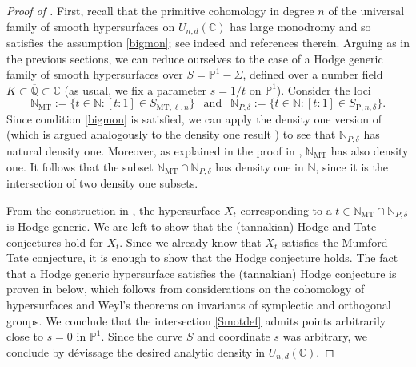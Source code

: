 \documentclass[10pt]{article}
\numberwithin{equation}{section}
\theoremstyle{plain}
\theoremstyle{definition}
\theoremstyle{remark}
\newcommand{\C}{\mathbb{C}}
\newcommand{\Qbar}{\overline{\mathbb{Q}}}
\newcommand{\N}{\mathbb{N}}
\newcommand{\PP}{\mathbb{P}}
\begin{document}
\begin{proof}[Proof of ]
First, recall that the primitive cohomology in degree $n$ of the universal family of smooth hypersurfaces on $U_{n,d}(\C)$ has large monodromy and so satisfies the assumption \eqref{bigmon}; see indeed \cite[Sec. 9.1]{2021arXiv210708838B} and references therein. Arguing as in the previous sections, we can reduce ourselves to the case of a Hodge generic family of smooth hypersurfaces over $S=\PP^1-\Sigma$, defined over a number field $K\subset \Qbar \subset \C$ (as usual, we fix a parameter $s = 1/t$ on $\mathbb{P}^1$). Consider the loci
\begin{displaymath}
    \N_{\mathrm{MT}}:=   \{ t \in \mathbb{N} : [t : 1] \in S_{\mathrm{MT},\ell,n}\}
 \ \ \text{  and  } \ \
     \N_{P, \delta}:=   \{ t \in \mathbb{N} : [t : 1] \in S_{\mathrm{P},n,\delta}\}.
\end{displaymath}
Since condition \eqref{bigmon} is satisfied, we can apply the density one version of  (which is argued analogously to the density one result ) to see that  $\N_{P, \delta}$ has natural density one. Moreover, as explained in the proof in , $\N_{\mathrm{MT}}$ has also density one. It follows that the subset $\N_{\mathrm{MT}} \cap \N_{P, \delta}$ has density one in $\mathbb{N}$, since it is the intersection of two density one subsets. 

From the construction in , the hypersurface $X_t$ corresponding to a $t \in  \N_{\mathrm{MT}}\cap \N_{P, \delta}$ is Hodge generic. We are left to show that the (tannakian) Hodge and Tate conjectures hold for $X_t$. Since we already know that $X_t$ satisfies the Mumford-Tate conjecture, it is enough to show that the Hodge conjecture holds. The fact that a Hodge generic hypersurface satisfies the (tannakian) Hodge conjecture is proven in  below, which follows from considerations on the cohomology of hypersurfaces and Weyl's theorems on invariants of symplectic and orthogonal groups. We conclude that the intersection \eqref{Smotdef} admits points arbitrarily close to $s = 0$ in $\PP^1$. Since the curve $S$ and coordinate $s$ was arbitrary, we conclude by d\'evissage the desired analytic density in $U_{n,d}(\C)$.




\end{proof}
\end{document}
